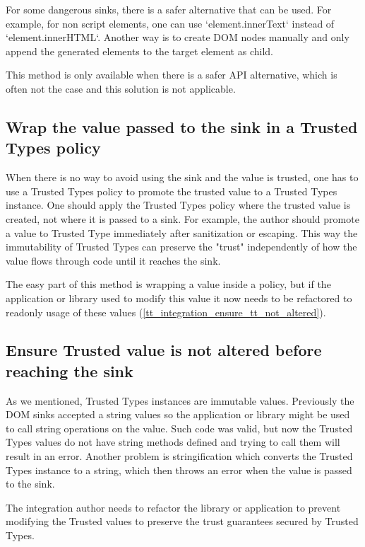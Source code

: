 For some dangerous sinks, there is a safer alternative that can be used. For example, for non script
elements, one can use `element.innerText` instead of `element.innerHTML`. Another way is to create
DOM nodes manually and only append the generated elements to the target element as child.

This method is only available when there is a safer API alternative, which is often not the case and
this solution is not applicable.

\subsection{Wrap the value passed to the sink in a Trusted Types policy}

When there is no way to avoid using the sink and the value is trusted, one has to use a Trusted
Types policy to promote the trusted value to a Trusted Types instance. One should apply the Trusted
Types policy where the trusted value is created, not where it is passed to a sink. For example, the
author should promote a value to Trusted Type immediately after sanitization or escaping. This way
the immutability of Trusted Types can preserve the "trust" independently of how the value flows
through code until it reaches the sink.

The easy part of this method is wrapping a value inside a policy, but if the application
or library used to modify this value it now needs to be refactored to readonly usage of these values
(\ref{tt_integration_ensure_tt_not_altered}).

\label{tt_integration_ensure_tt_not_altered}
\subsection{Ensure Trusted value is not altered before reaching the sink}

As we mentioned, Trusted Types instances are immutable values. Previously the DOM sinks accepted a
string values so the application or library might be used to call string operations on the value.
Such code was valid, but now the Trusted Types values do not have string methods defined and trying
to call them will result in an error. Another problem is stringification which converts the Trusted
Types instance to a string, which then throws an error when the value is passed to the sink.

The integration author needs to refactor the library or application to prevent modifying the
Trusted values to preserve the trust guarantees secured by Trusted Types.

